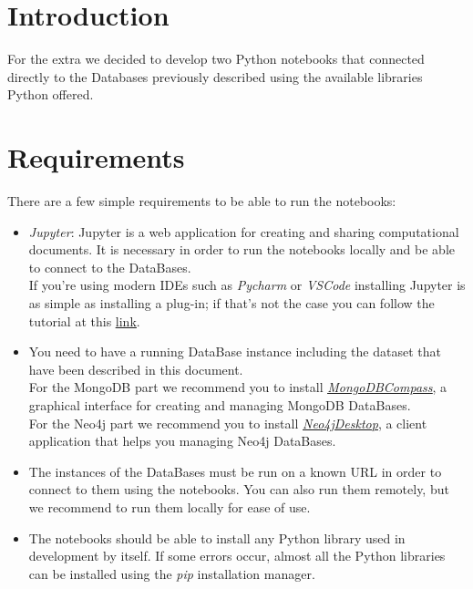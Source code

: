 \documentclass{Configuration_Files/PoliMi3i_thesis}
\begin{document}
\section{Introduction}
For the extra we decided to develop two Python notebooks that connected directly to the Databases previously described using the available libraries Python offered.

\section{Requirements}
There are a few simple requirements to be able to run the notebooks:

\begin{itemize}
    \item \textit{Jupyter}: Jupyter is a web application for creating and sharing computational documents. It is necessary in order to run the notebooks locally and be able to connect to the DataBases.\\
    If you're using modern IDEs such as \textit{Pycharm} or \textit{VSCode} installing Jupyter is as simple as installing a plug-in; if that's not the case you can follow the tutorial at this \href{https://www.geeksforgeeks.org/install-jupyter-notebook-in-windows/}{\underline{link}}.

    \item You need to have a running DataBase instance including the dataset that have been described in this document.\\
    For the MongoDB part we recommend you to install \textit{\underline{\href{https://www.mongodb.com/products/tools/compass}{MongoDBCompass}}}, a graphical interface for creating and managing MongoDB DataBases.\\
    For the Neo4j part we recommend you to install \textit{\underline{\href{https://neo4j.com/docs/desktop-manual/current/}{Neo4jDesktop}}}, a client application that helps you managing Neo4j DataBases.

    \item The instances of the DataBases must be run on a known URL in order to connect to them using the notebooks. You can also run them remotely, but we recommend to run them locally for ease of use.

    \item The notebooks should be able to install any Python library used in development by itself. If some errors occur, almost all the Python libraries can be installed using the \textit{pip} installation manager.
\end{itemize}
\end{document}
